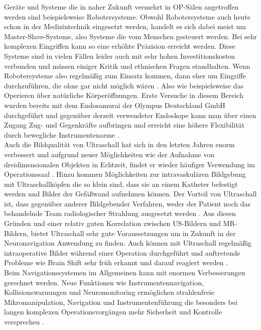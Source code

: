 Geräte und Systeme die in naher Zukunft vermehrt in OP-Sälen angetroffen werden sind beispielsweise Robotersysteme. Obwohl Robotersysteme auch heute schon in der Medizintechnik eingesetzt werden, handelt es sich dabei meist um Master-Slave-Systeme, also Systeme die vom Menschen gesteuert werden. Bei sehr komplexen Eingriffen kann so eine erhöhte Präzision erreicht werden. Diese Systeme sind in vielen Fällen leider auch mit sehr hohen Investitionskosten verbunden und müssen einiger Kritik und ethnischen Fragen standhalten. Wenn Robotersysteme also regelmäßig zum Einsatz kommen, dann eher um Eingriffe durchzuführen, die ohne gar nicht möglich wären \cite{DerDigitaleOperationssaal}. Also wie beispielsweise das Operieren über natürliche Körperöffnungen. Erste Versuche in diesem Bereich wurden bereits mit dem Endosamurai der Olympus Deutschland GmbH durchgeführt und gegenüber derzeit verwendeter Endoskope kann man über einen Zugang Zug- und Gegenkräfte aufbringen und erreicht eine höhere Flexibilität durch bewegliche Instrumentenarme \cite{Endosamurai,DerDigitaleOperationssaal}. \\
Auch die Bildqualität von Ultraschall hat sich in den letzten Jahren enorm verbessert und aufgrund neuer Möglichkeiten wie der Aufnahme von dreidimensionalen Objekten in Echtzeit, findet er wieder häufiger Verwendung im Operationssaal \cite{BrainShiftInTumorResection}. Hinzu kommen Möglichkeiten zur intravaskulären Bildgebung mit Ultraschallköpfen die so klein sind, dass sie an einem Katheter befestigt werden und Bilder der Gefäßwand aufnehmen können. Der Vorteil von Ultraschall ist, dass gegenüber anderer Bildgebender Verfahren, weder der Patient noch das behandelnde Team radiologischer Strahlung ausgesetzt werden \cite{CurrentAndFuture}. Aus diesen Gründen und einer relativ guten Korrelation zwischen US-Bildern und MR-Bildern, bietet Ultraschall sehr gute Voraussetzungen um in Zukunft in der Neuronavigation Anwendung zu finden. Auch können mit Ultraschall regelmäßig intraoperative Bilder während einer Operation durchgeführt und auftretende Probleme wie Brain Shift sehr früh erkannt und darauf reagiert werden \cite{BrainShiftInTumorResection}. \\
Beim Navigationssystemen im Allgemeinen kann mit enormen Verbesserungen gerechnet werden. Neue Funktionen wie Instrumentennavigation, Kollisionswarnungen und Neuromonitoring ermöglichen strahlenfreie Mikromanipulation, Navigation und Instrumentenführung die besonders bei langen komplexen Operationsvorgängen mehr Sicherheit und Kontrolle versprechen \cite{DerDigitaleOperationssaal,CurrentAndFuture}. 


